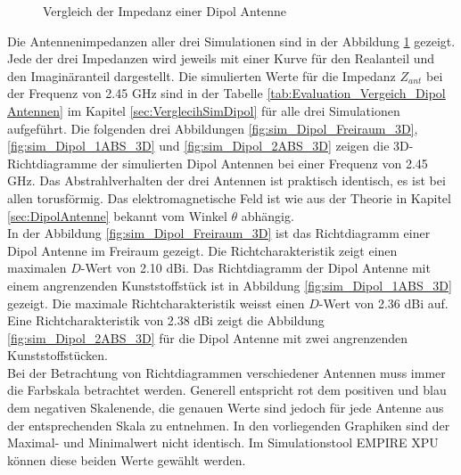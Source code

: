 \begin{figure}[!ht]
	\centering
	\begingroup
	
	\endgroup
	\caption{Vergleich der Impedanz einer Dipol Antenne}
	\label{Impedanz_Vergleich_Simulation}
\end{figure}
\newpage
Die Antennenimpedanzen aller drei Simulationen sind in der Abbildung \ref{Impedanz_Vergleich_Simulation} gezeigt. Jede der drei Impedanzen wird jeweils mit einer Kurve für den Realanteil und den Imaginäranteil dargestellt. Die simulierten Werte für die Impedanz $Z_{ant}$ bei der Frequenz von 2.45 GHz sind in der Tabelle \ref{tab:Evaluation_Vergeich_Dipol Antennen} im Kapitel \ref{sec:VerglecihSimDipol} für alle drei Simulationen aufgeführt.
\clearpage
\newpage
%
Die folgenden drei Abbildungen \ref{fig:sim_Dipol_Freiraum_3D},
\ref{fig:sim_Dipol_1ABS_3D} und 
\ref{fig:sim_Dipol_2ABS_3D} zeigen die 3D-Richtdiagramme der simulierten Dipol Antennen bei einer Frequenz von 2.45 GHz. Das Abstrahlverhalten der drei Antennen ist praktisch identisch, es ist bei allen torusförmig. Das elektromagnetische Feld ist wie aus der Theorie in Kapitel \ref{sec:DipolAntenne} bekannt vom Winkel $\theta$ abhängig.\\
In der Abbildung \ref{fig:sim_Dipol_Freiraum_3D} ist das Richtdiagramm einer Dipol Antenne im Freiraum gezeigt. Die Richtcharakteristik zeigt einen maximalen $D$-Wert von 2.10 dBi. Das Richtdiagramm der Dipol Antenne mit einem angrenzenden Kunststoffstück ist in Abbildung \ref{fig:sim_Dipol_1ABS_3D} gezeigt. Die maximale Richtcharakteristik weisst einen $D$-Wert von 2.36 dBi auf. Eine Richtcharakteristik von 2.38 dBi zeigt die Abbildung \ref{fig:sim_Dipol_2ABS_3D} für die Dipol Antenne mit zwei angrenzenden Kunststoffstücken.\\
Bei der Betrachtung von Richtdiagrammen verschiedener Antennen muss immer die Farbskala betrachtet werden. Generell entspricht rot dem positiven und blau dem negativen Skalenende, die genauen Werte sind jedoch für jede Antenne aus der entsprechenden Skala zu entnehmen. In den vorliegenden Graphiken sind der Maximal- und Minimalwert nicht identisch. Im Simulationstool EMPIRE XPU können diese beiden Werte gewählt werden. 
